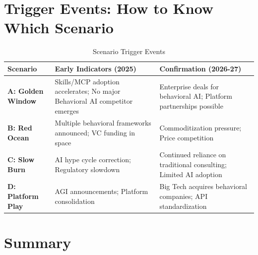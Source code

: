 \section{Trigger Events: How to Know Which Scenario}
\label{sec:vvv-triggers}

\begin{table}[htbp]
\centering
\caption{Scenario Trigger Events}
\label{tab:vvv-triggers}
\renewcommand{\arraystretch}{1.3}
\begin{tabular}{@{}lp{5cm}p{5cm}@{}}
\toprule
\textbf{Scenario} & \textbf{Early Indicators (2025)} & \textbf{Confirmation (2026-27)} \\
\midrule
\textbf{A: Golden Window} &
Skills/MCP adoption accelerates; No major Behavioral AI competitor emerges &
Enterprise deals for behavioral AI; Platform partnerships possible \\
\midrule
\textbf{B: Red Ocean} &
Multiple behavioral frameworks announced; VC funding in space &
Commoditization pressure; Price competition \\
\midrule
\textbf{C: Slow Burn} &
AI hype cycle correction; Regulatory slowdown &
Continued reliance on traditional consulting; Limited AI adoption \\
\midrule
\textbf{D: Platform Play} &
AGI announcements; Platform consolidation &
Big Tech acquires behavioral companies; API standardization \\
\bottomrule
\end{tabular}
\end{table}


\section{Summary}
\label{sec:vvv-summary}

